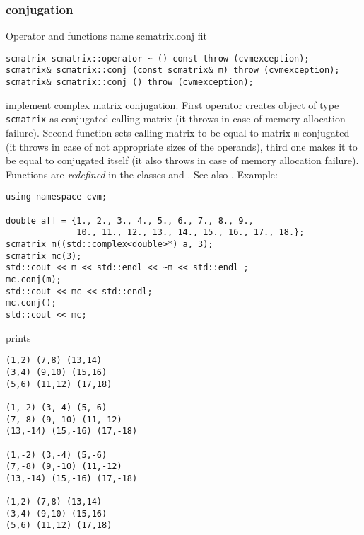 \subsubsection{conjugation}
Operator and functions%
\pdfdest name {scmatrix.conj} fit
\begin{verbatim}
scmatrix scmatrix::operator ~ () const throw (cvmexception);
scmatrix& scmatrix::conj (const scmatrix& m) throw (cvmexception);
scmatrix& scmatrix::conj () throw (cvmexception);
\end{verbatim}
implement complex matrix conjugation.
First operator creates  object of type \verb"scmatrix" as
 conjugated calling matrix
(it throws  
in case of memory allocation failure). 
Second function sets  calling matrix to be equal to  matrix
\verb"m" conjugated
(it throws  
in case of not appropriate sizes of the operands), 
third one makes it to be equal to
conjugated itself (it also throws  
in case of memory allocation failure). 
Functions are \emph{redefined} in the classes
and .
See also .
Example:
\begin{Verbatim}
using namespace cvm;

double a[] = {1., 2., 3., 4., 5., 6., 7., 8., 9.,
              10., 11., 12., 13., 14., 15., 16., 17., 18.};
scmatrix m((std::complex<double>*) a, 3);
scmatrix mc(3);
std::cout << m << std::endl << ~m << std::endl ;
mc.conj(m);
std::cout << mc << std::endl;
mc.conj();
std::cout << mc;
\end{Verbatim}
prints
\begin{Verbatim}
(1,2) (7,8) (13,14)
(3,4) (9,10) (15,16)
(5,6) (11,12) (17,18)

(1,-2) (3,-4) (5,-6)
(7,-8) (9,-10) (11,-12)
(13,-14) (15,-16) (17,-18)

(1,-2) (3,-4) (5,-6)
(7,-8) (9,-10) (11,-12)
(13,-14) (15,-16) (17,-18)

(1,2) (7,8) (13,14)
(3,4) (9,10) (15,16)
(5,6) (11,12) (17,18)
\end{Verbatim}
\newpage





